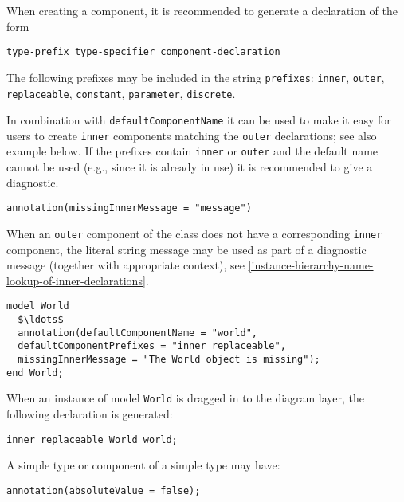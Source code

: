 When creating a component, it is recommended to generate a declaration of the form
\begin{lstlisting}[language=grammar]
type-prefix type-specifier component-declaration
\end{lstlisting}

The following prefixes may be included in the string \lstinline!prefixes!: \lstinline!inner!,
\lstinline!outer!, \lstinline!replaceable!, \lstinline!constant!, \lstinline!parameter!, \lstinline!discrete!.

\begin{nonnormative}
In combination with \lstinline!defaultComponentName! it can be used to make it easy for users to create \lstinline!inner! components
matching the \lstinline!outer! declarations; see also example below.  If the prefixes contain \lstinline!inner! or \lstinline!outer!
and the default name cannot be used (e.g., since it is already in use) it is recommended to give a diagnostic.
\end{nonnormative}

\begin{lstlisting}[language=modelica]
annotation(missingInnerMessage = "message")
\end{lstlisting}%

When an \lstinline!outer! component of the class does not have a corresponding \lstinline!inner!
component, the literal string message may be used as part of a diagnostic message (together with appropriate context), see
\cref{instance-hierarchy-name-lookup-of-inner-declarations}.

\begin{example}
\begin{lstlisting}[language=modelica]
model World
  $\ldots$
  annotation(defaultComponentName = "world",
  defaultComponentPrefixes = "inner replaceable",
  missingInnerMessage = "The World object is missing");
end World;
\end{lstlisting}
When an instance of model \lstinline!World! is dragged in to the diagram layer, the
following declaration is generated:
\begin{lstlisting}[language=modelica]
inner replaceable World world;
\end{lstlisting}
\end{example}

A simple type or component of a simple type may have:
\begin{lstlisting}[language=modelica]
annotation(absoluteValue = false);
\end{lstlisting}%

